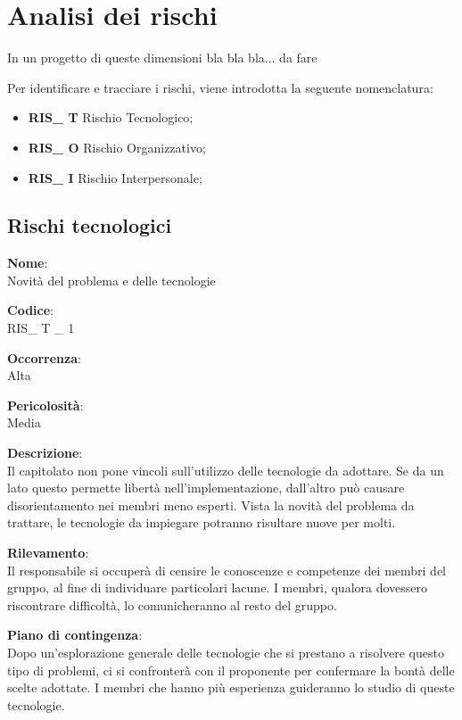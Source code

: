 \section{Analisi dei rischi}
In un progetto di queste dimensioni bla bla bla... da fare

Per identificare e tracciare i rischi, viene introdotta la seguente nomenclatura:
\begin{itemize}
	\item \textbf{RIS\_ T} Rischio Tecnologico;
	\item \textbf{RIS\_ O} Rischio Organizzativo;
	\item \textbf{RIS\_ I} Rischio Interpersonale;
\end{itemize}



\subsection{Rischi tecnologici}



{\setlength{\parindent}{0cm}
\begin{minipage}{\textwidth} 
\begin{multicols}{4}
\textbf{Nome}: \\ Novità del problema e delle tecnologie \columnbreak

\textbf{Codice}: \\ RIS\_ T \_ 1 
\columnbreak

\textbf{Occorrenza}: \\ Alta 
\columnbreak

\textbf{Pericolosità}: \\ Media

\end{multicols}

\begin{multicols}{3}

\textbf{Descrizione}: \\ Il capitolato non pone vincoli sull'utilizzo delle tecnologie da adottare. Se da un lato questo permette libertà nell'implementazione, dall'altro può causare disorientamento nei membri meno esperti. Vista la novità del problema da trattare, le tecnologie da impiegare potranno risultare nuove per molti.
\columnbreak

\textbf{Rilevamento}: \\ Il responsabile si occuperà di censire le conoscenze e competenze dei membri del gruppo, al fine di individuare particolari lacune. I membri, qualora dovessero riscontrare difficoltà, lo comunicheranno al resto del gruppo.  
\columnbreak

\textbf{Piano di contingenza}: \\ Dopo un'esplorazione generale delle tecnologie che si prestano a risolvere questo tipo di problemi, ci si confronterà con il proponente per confermare la bontà delle scelte adottate. I membri che hanno più esperienza guideranno lo studio di queste tecnologie.\\

\columnbreak
\end{multicols}
\end{minipage}} \\


